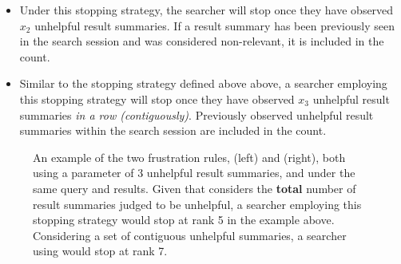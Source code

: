 \begin{itemize}
    
    \item[]{} Under this stopping strategy, the searcher will stop once they have observed $x_2$ unhelpful result summaries. If a result summary has been previously seen in the search session and was considered non-relevant, it is included in the count.
    
    \item[]{} Similar to the stopping strategy defined above above, a searcher employing this stopping strategy will stop once they have observed $x_3$ unhelpful result summaries \emph{in a row (contiguously)}. Previously observed unhelpful result summaries within the search session are included in the count.
    
\end{itemize}

\begin{figure}[t!]
    \centering
    \caption[Examples of frustration rules  and ]{An example of the two frustration rules,  (left) and  (right), both using a parameter of 3 unhelpful result summaries, and under the same query and results. Given that  considers the \textbf{total} number of result summaries judged to be unhelpful, a searcher employing this stopping strategy would stop at rank 5 in the example above. Considering a set of contiguous unhelpful summaries, a searcher using  would stop at rank 7.}
    \label{fig:ss23}
\end{figure}

